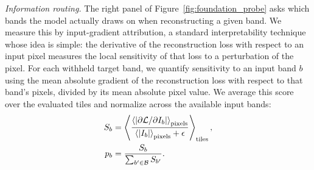 \documentclass[twocolumn,linenumbers]{aastex701}
\begin{document}
\textit{Information routing.} The right panel of Figure~\ref{fig:foundation_probe} asks which bands the model actually draws on when reconstructing a given band. We measure this by input-gradient attribution, a standard interpretability technique whose idea is simple: the derivative of the reconstruction loss with respect to an input pixel measures the local sensitivity of that loss to a perturbation of the pixel. For each withheld target band, we quantify sensitivity to an input band $b$ using the mean absolute gradient of the reconstruction loss with respect to that band's pixels, divided by its mean absolute pixel value. We average this score over the evaluated tiles and normalize across the available input bands:
\begin{equation}
\begin{aligned}
S_b &= \left\langle
\frac{\left\langle\left|\partial\mathcal{L}/\partial I_b\right|\right\rangle_{\rm pixels}}
{\left\langle|I_b|\right\rangle_{\rm pixels}+\epsilon}
\right\rangle_{\rm tiles}, \\
p_b &= \frac{S_b}{\sum_{b'\in\mathcal B}S_{b'}}.
\end{aligned}
\label{eq:attribution_sensitivity}
\end{equation}
\end{document}
